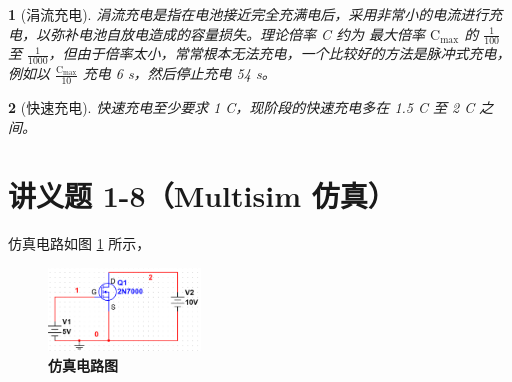 \documentclass[UTF8]{report}
\theoremstyle{MyLineTheoremStyle} %
\theoremstyle{MyBlockTheoremStyle} %
\theoremstyle{MySubsubsectionStyle} %
\newtheorem{definition}{}
\begin{document}
\begin{definition}[涓流充电]
涓流充电是指在电池接近完全充满电后，采用非常小的电流进行充电，以弥补电池自放电造成的容量损失。理论倍率 C 约为 最大倍率 $\mathrm{C_{max}}$ 的 $\frac{1}{100}$ 至 $\frac{1}{1000}$，但由于倍率太小，常常根本无法充电，一个比较好的方法是脉冲式充电，例如以 $\frac{\mathrm{C_{max}}}{10}$ 充电 6 s，然后停止充电 54 s。
\end{definition}


\begin{definition}[快速充电]
快速充电至少要求 1 C，现阶段的快速充电多在 1.5 C 至 2 C 之间。
\end{definition}


\section{讲义题 1-8（Multisim 仿真）}

仿真电路如图 \ref{仿真电路图} 所示，

\begin{figure}[H]\centering
\includegraphics[width=0.36\textwidth]{assets/1/5c45ed5b5258df3fa8e1babac4a7ace2.png}
\caption{\textbf{仿真电路图}}\label{仿真电路图}
\end{figure}
\end{document}
